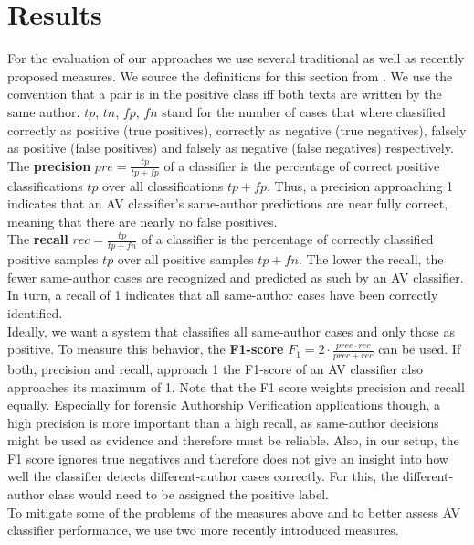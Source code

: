 \chapter{Results}\label{results}
For the evaluation of our approaches we use several traditional as well as recently proposed measures.
We source the definitions for this section from \cite{schutze2008introduction}.
We use the convention that a pair is in the positive class iff both texts are written by the same author.
$tp$, $tn$, $fp$, $fn$ stand for the number of cases that where classified correctly as positive (true positives), correctly as negative (true negatives), falsely as positive (false positives) and falsely as negative (false negatives) respectively.\\
The \textbf{precision} $pre = \frac{tp}{tp+fp}$ of a classifier is the percentage of correct positive classifications $tp$ over all classifications $tp+fp$.
Thus, a precision approaching 1 indicates that an AV classifier's same-author predictions are near fully correct, meaning that there are nearly no false positives.\\
The \textbf{recall} $rec = \frac{tp}{tp+fn}$ of a classifier is the percentage of correctly classified positive samples $tp$ over all positive samples $tp+fn$.
The lower the recall, the fewer same-author cases are recognized and predicted as such by an AV classifier.
In turn, a recall of 1 indicates that all same-author cases have been correctly identified.\\
Ideally, we want a system that classifies all same-author cases and only those as positive.
To measure this behavior, the \textbf{F1-score} $F_1 = 2\cdot\frac{prec\cdot{}rec}{prec+rec}$ can be used.
If both, precision and recall, approach 1 the F1-score of an AV classifier also approaches its maximum of 1.
Note that the F1 score weights precision and recall equally.
Especially for forensic Authorship Verification applications though, a high precision is more important than a high recall, as same-author decisions might be used as evidence and therefore must be reliable.
Also, in our setup, the F1 score ignores true negatives and therefore does not give an insight into how well the classifier detects different-author cases correctly.
For this, the different-author class would need to be assigned the positive label.\\
To mitigate some of the problems of the measures above and to better assess AV classifier performance, we use two more recently introduced measures.
